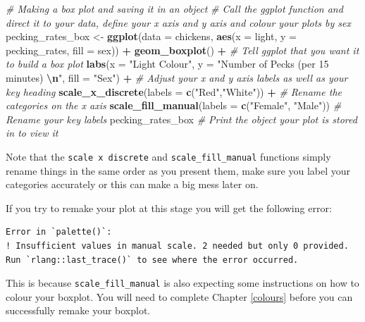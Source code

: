 \documentclass[
]{book}
\newenvironment{Shaded}{\begin{snugshade}}{\end{snugshade}}
\newcommand{\AttributeTok}[1]{\textcolor[rgb]{0.13,0.29,0.53}{#1}}
\newcommand{\CommentTok}[1]{\textcolor[rgb]{0.56,0.35,0.01}{\textit{#1}}}
\newcommand{\FunctionTok}[1]{\textcolor[rgb]{0.13,0.29,0.53}{\textbf{#1}}}
\newcommand{\NormalTok}[1]{#1}
\newcommand{\OtherTok}[1]{\textcolor[rgb]{0.56,0.35,0.01}{#1}}
\newcommand{\SpecialCharTok}[1]{\textcolor[rgb]{0.81,0.36,0.00}{\textbf{#1}}}
\newcommand{\StringTok}[1]{\textcolor[rgb]{0.31,0.60,0.02}{#1}}
\begin{document}
\begin{Shaded}
\begin{Highlighting}[]
\CommentTok{\# Making a box plot and saving it in an object}
\CommentTok{\# Call the ggplot function and direct it to your data, define your x axis and y axis and colour your plots by sex}
\NormalTok{pecking\_rates\_box }\OtherTok{\textless{}{-}} \FunctionTok{ggplot}\NormalTok{(}\AttributeTok{data =}\NormalTok{ chickens, }\FunctionTok{aes}\NormalTok{(}\AttributeTok{x =}\NormalTok{ light, }\AttributeTok{y =}\NormalTok{ pecking\_rates, }\AttributeTok{fill =}\NormalTok{ sex)) }\SpecialCharTok{+}
  \FunctionTok{geom\_boxplot}\NormalTok{() }\SpecialCharTok{+} \CommentTok{\# Tell ggplot that you want it to build a box plot}
  \FunctionTok{labs}\NormalTok{(}\AttributeTok{x =} \StringTok{"Light Colour"}\NormalTok{, }\AttributeTok{y =} \StringTok{"Number of Pecks (per 15 minutes) }\SpecialCharTok{\textbackslash{}n}\StringTok{"}\NormalTok{, }\AttributeTok{fill =} \StringTok{"Sex"}\NormalTok{) }\SpecialCharTok{+} \CommentTok{\# Adjust your x and y axis labels as well as your key heading}
  \FunctionTok{scale\_x\_discrete}\NormalTok{(}\AttributeTok{labels =} \FunctionTok{c}\NormalTok{(}\StringTok{"Red"}\NormalTok{,}\StringTok{"White"}\NormalTok{)) }\SpecialCharTok{+} \CommentTok{\# Rename the categories on the x axis }
  \FunctionTok{scale\_fill\_manual}\NormalTok{(}\AttributeTok{labels =} \FunctionTok{c}\NormalTok{(}\StringTok{"Female"}\NormalTok{, }\StringTok{"Male"}\NormalTok{)) }\CommentTok{\# Rename your key labels}
\NormalTok{pecking\_rates\_box }\CommentTok{\# Print the object your plot is stored in to view it}
\end{Highlighting}
\end{Shaded}

Note that the \texttt{scale\ x\ discrete} and \texttt{scale\_fill\_manual} functions simply rename things in the same order as you present them, make sure you label your categories accurately or this can make a big mess later on.

If you try to remake your plot at this stage you will get the following error:

\begin{verbatim}
Error in `palette()`:
! Insufficient values in manual scale. 2 needed but only 0 provided.
Run `rlang::last_trace()` to see where the error occurred.
\end{verbatim}

This is because \texttt{scale\_fill\_manual} is also expecting some instructions on how to colour your boxplot. You will need to complete Chapter \ref{colours} before you can successfully remake your boxplot.
\end{document}
